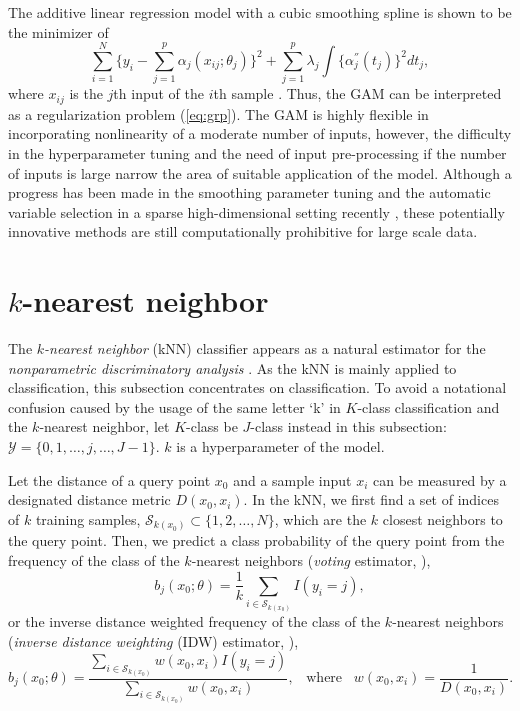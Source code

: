 \documentclass[12pt]{article}
\begin{document}
The additive linear regression model with a cubic smoothing spline is shown to be the minimizer of
\begin{equation*}
\sum_{i=1}^N \{y_i - \sum_{j=1}^p \alpha_j(x_{ij};\theta_j)\}^2 + \sum_{j=1}^p \lambda_j \int \{\alpha_j^{''}(t_j)\}^2 dt_j,
\end{equation*}
where $x_{ij}$ is the $j$th input of the $i$th sample \parencite{Hastie2009}. Thus, the GAM can be interpreted as a regularization problem (\ref{eq:grp}). The GAM is highly flexible in incorporating nonlinearity of a moderate number of inputs, however, the difficulty in the hyperparameter tuning and the need of input pre-processing if the number of inputs is large narrow the area of suitable application of the model. Although a progress has been made in the smoothing parameter tuning and the automatic variable selection in a sparse high-dimensional setting recently \parencite{Lin2006,Ravikumar2009}, these potentially innovative methods are still computationally prohibitive for large scale data.


\section{$k$-nearest neighbor}

The {\it $k$-nearest neighbor} (kNN) classifier appears as a natural estimator for the {\it nonparametric discriminatory analysis} \parencite{Fix1951}. As the kNN is mainly applied to classification, this subsection concentrates on classification. To avoid a notational confusion caused by the usage of the same letter `k' in $K$-class classification and the $k$-nearest neighbor, let $K$-class be $J$-class instead in this subsection: $\mathcal{Y} = \{0,1,\dots,j,\dots,J-1\}$. $k$ is a hyperparameter of the model.

Let the distance of a query point $x_0$ and a sample input $x_i$ can be measured by a designated distance metric $D(x_0,x_i)$. In the kNN, we first find a set of indices of $k$ training samples, $\mathcal{S}_{k(x_0)} \subset \{1,2,\dots,N\}$, which are the $k$ closest neighbors to the query point. Then, we predict a class probability of the query point from the frequency of the class of the $k$-nearest neighbors ({\it voting} estimator, \textcite{Fix1951}),
\begin{equation*}
b_j(x_0;\theta) = \frac{1}{k} \sum_{i \in \mathcal{S}_{k(x_0)}} I(y_i = j),
\end{equation*}
or the inverse distance weighted frequency of the class of the $k$-nearest neighbors ({\it inverse distance weighting} (IDW) estimator, \textcite{Shepard1968}),
\begin{equation*}
b_j(x_0;\theta) = \frac{\sum_{i \in \mathcal{S}_{k(x_0)}} w(x_0,x_i) I(y_i = j)}{\sum_{i \in \mathcal{S}_{k(x_0)}} w(x_0,x_i)}, \hspace{10pt} \text{where} \hspace{10pt} w(x_0,x_i) = \frac{1}{D(x_0,x_i)}.
\end{equation*}
\end{document}
